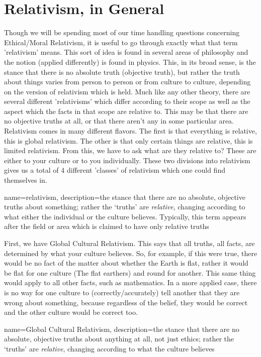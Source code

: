 \section{Relativism, in General}

Though we will be spending most of our time handling questions concerning Ethical/Moral Relativism, it is useful to go through exactly what that term '\Gls{relativism}' means. This sort of idea is found in several areas of philosophy and the notion (applied differently) is found in physics. This, in its broad sense, is the stance that there is no absolute truth (objective truth), but rather the truth about things varies from person to person or from culture to culture, depending on the version of relativism which is held. Much like any other theory, there are several different 'relativisms' which differ according to their scope as well as the aspect which the facts in that scope are relative to.  This may be that there are no objective truths at all, or that there aren’t any in some particular area. Relativism comes in many different flavors. The first is that everything is relative, this is global relativism. The other is that only certain things are relative, this is limited relativism. From this, we have to ask what are they relative to? These are either to your culture or to you individually. These two divisions into relativism gives us a total of 4 different 'classes' of relativism which one could find themselves in.

{
  name=relativism,
  description={the stance that there are no absolute, objective truths about something; rather the `truths' are \emph{relative}, changing according to what either the individual or the culture believes. Typically, this term appears after the field or area which is claimed to have only relative truths}
}


First, we have \gls{Global Cultural Relativism}. This says that all truths, all facts, are determined by what your culture believes. So, for example, if this were true, there would be no fact of the matter about whether the Earth is flat, rather it would be flat for one culture (The flat earthers) and round for another. This same thing would apply to all other facts, such as mathematics. In a more applied case, there is no way for one culture to (correctly/accurately) tell another that they are wrong about something, because regardless of the belief, they would be correct and the other culture would be correct too.

{
  name=Global Cultural Relativism,
  description={the stance that there are no absolute, objective truths about anything at all, not just ethics; rather the `truths' are \emph{relative}, changing according to what the culture believes}
}


